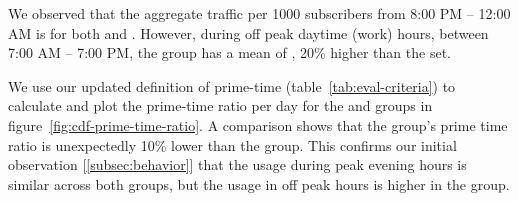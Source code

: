 We observed that the aggregate traffic per 1000 subscribers from 8:00 PM -- 12:00 AM is 
 for both \treatment{} and \control{}. However, during off peak 
daytime (work) hours, between 7:00 AM -- 7:00 PM, the \treatment{} group has a 
mean of , 20\% higher than the \control{} set.

We use our updated definition of prime-time (table~\ref{tab:eval-criteria}) 
to calculate and plot the prime-time ratio per day for the \treatment{} and
\control{} groups in figure~\ref{fig:cdf-prime-time-ratio}. A comparison shows 
that
the \treatment{} group's prime time ratio is unexpectedly 10\% lower than the 
\control{} group. This confirms our initial observation 
[\autoref{subsec:behavior}]
that the usage during peak evening hours is similar across both groups, but the
usage in off peak hours is higher in the \treatment{} group.


